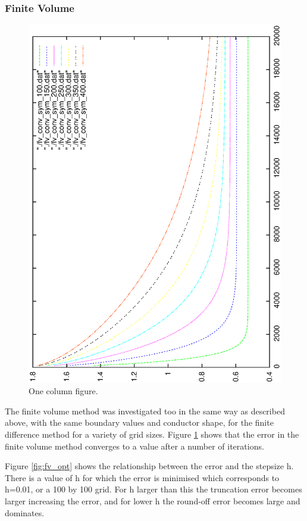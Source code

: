 \documentclass[aps,twocolumn,pre,nofootinbib]{revtex4}
\begin{document}
\subsubsection{Finite Volume}

\begin{figure}
\includegraphics[height=\breite \columnwidth,angle=-90]{sym_fv_conv.eps}

\caption{One column figure.}
\label{fig:fv}
\end{figure}

The finite volume method was investigated too in the same way as described above, with the same boundary values and conductor shape, for the finite difference method for a variety of grid sizes. Figure \ref{fig:fv} shows that the error in the finite volume method converges to a value after a number of iterations.

Figure \ref{fig:fv_opt} shows the relationship between the error and the stepsize h. There is a value of h for which the error is minimised which corresponds to h=0.01, or a 100 by 100 grid. For h larger than this the truncation error becomes larger increasing the error, and for lower h the round-off error becomes large and dominates.
\end{document}
